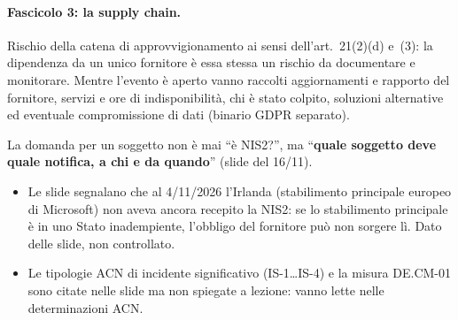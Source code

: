 \paragraph{Fascicolo 3: la supply chain.} Rischio della catena di approvvigionamento ai sensi
dell'art.~21(2)(d) e~(3): la dipendenza da un unico fornitore è essa stessa un rischio da documentare
e monitorare. Mentre l'evento è aperto vanno raccolti aggiornamenti e rapporto del fornitore, servizi e
ore di indisponibilità, chi è stato colpito, soluzioni alternative ed eventuale compromissione di dati
(binario GDPR separato).

\begin{esame}
La domanda per un soggetto non è mai ``è NIS2?'', ma ``\textbf{quale soggetto deve quale notifica, a chi
e da quando}'' (slide del 16/11).
\end{esame}

\begin{verifica}
\begin{itemize}
  \item Le slide segnalano che al 4/11/2026 l'Irlanda (stabilimento principale europeo di Microsoft) non
    aveva ancora recepito la NIS2: se lo stabilimento principale è in uno Stato inadempiente, l'obbligo
    del fornitore può non sorgere lì. Dato delle slide, non controllato.
  \item Le tipologie ACN di incidente significativo (IS-1\ldots IS-4) e la misura DE.CM-01 sono citate
    nelle slide ma non spiegate a lezione: vanno lette nelle determinazioni ACN.
\end{itemize}
\end{verifica}

